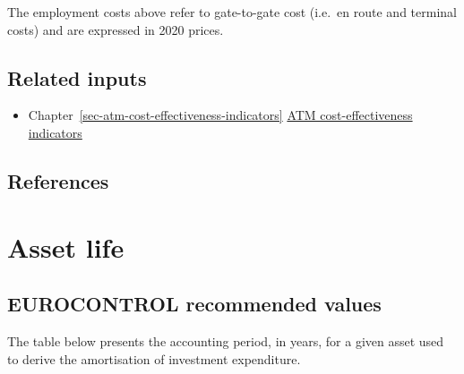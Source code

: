 \documentclass[
  11pt,
  a4paper,
]{book}
\providecommand{\tightlist}{%
  \setlength{\itemsep}{0pt}\setlength{\parskip}{0pt}}\usepackage{longtable,booktabs,array}
\begin{document}
\begin{tcolorbox}[enhanced jigsaw, colframe=quarto-callout-note-color-frame, colback=white, toptitle=1mm, coltitle=black, leftrule=.75mm, title=\textcolor{quarto-callout-note-color}{\faInfo}\hspace{0.5em}{Note}, left=2mm, rightrule=.15mm, bottomtitle=1mm, breakable, titlerule=0mm, arc=.35mm, colbacktitle=quarto-callout-note-color!10!white, bottomrule=.15mm, opacityback=0, opacitybacktitle=0.6, toprule=.15mm]

The employment costs above refer to gate-to-gate cost (i.e.~en route and
terminal costs) and are expressed in 2020 prices.

\end{tcolorbox}

\hypertarget{related-inputs-13}{%
\section{Related inputs}\label{related-inputs-13}}

\begin{itemize}
\tightlist
\item
  Chapter~\ref{sec-atm-cost-effectiveness-indicators}
  \protect\hyperlink{sec-atm-cost-effectiveness-indicators}{ATM
  cost-effectiveness indicators}
\end{itemize}

\hypertarget{references-12}{%
\section{References}\label{references-12}}

\hypertarget{sec-asset-life}{%
\chapter{Asset life}\label{sec-asset-life}}

\hypertarget{eurocontrol-recommended-values-12}{%
\section{EUROCONTROL recommended
values}\label{eurocontrol-recommended-values-12}}

The table below presents the accounting period, in years, for a given
asset used to derive the amortisation of investment expenditure.
\end{document}
